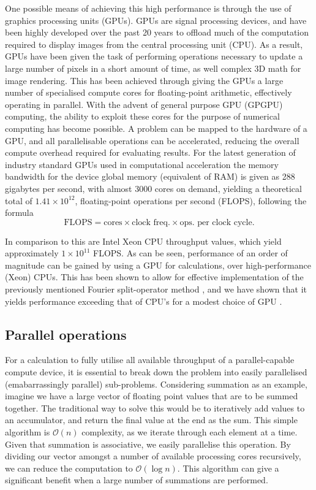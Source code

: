 One possible means of achieving this high performance is through the use of graphics processing units (GPUs). GPUs are signal processing devices, and have been highly developed over the past 20 years to offload much of the computation required to display images from the central processing unit (CPU). As a result, GPUs have been given the task of performing operations necessary to update a large number of pixels in a short amount of time, as well complex 3D math for image rendering. This has been achieved through giving the GPUs a large number of specialised compute cores for floating-point arithmetic, effectively operating in parallel. With the advent of general purpose GPU (GPGPU) computing, the ability to exploit these cores for the purpose of numerical computing has become possible. A problem can be mapped to the hardware of a GPU, and all parallelisable operations can be accelerated, reducing the overall compute overhead required for evaluating results. For the latest generation of industry standard GPUs used in computational acceleration the memory bandwidth for the device global memory (equivalent of RAM) is given as 288 gigabytes per second, with almost 3000 cores on demand, yielding a theoretical total of $1.41\times10^{12}$, floating-point operations per second (FLOPS), following the formula
\begin{equation}
    \text{FLOPS} = \text{cores}\times\text{clock freq.}\times\text{ops. per clock cycle}.
\end{equation}

In comparison to this are Intel Xeon CPU throughput values, which yield approximately $1\times10^{11}$ FLOPS. As can be seen, performance of an order of magnitude can be gained by using a GPU for calculations, over high-performance (Xeon) CPUs. This has been shown to allow for effective implementation of the previously mentioned Fourier split-operator method \cite{Num:Bauke_cpc_2011}, and we have shown that it yields performance exceeding that of CPU's for a modest choice of GPU \cite{AO:Morgan_ORiordan_pra_2013}.


\subsection{Parallel operations}
\label{sub:Parallel operations}
For a calculation to fully utilise all available throughput of a parallel-capable
compute device, it is essential to break down the problem into easily parallelised (emabarrassingly parallel) sub-problems. Considering summation as an example, imagine we have a large vector of floating point values that are to be summed together. The traditional way to solve this would be to iteratively add values to an accumulator, and return the final value at the end as the sum. This simple algorithm is $\mathcal{O}(n)$ complexity, as we iterate through each element at a time. Given that summation is associative, we easily parallelise this operation. By dividing our vector amongst a number of available processing cores recursively, we can reduce the computation to $\mathcal{O}(\log{} n)$. This algorithm can give a significant benefit when a large number of summations are performed.

